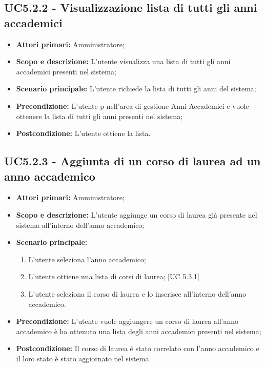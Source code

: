 \documentclass[AnalisiDeiRequisiti.tex]{subfiles}
\begin{document}
\subsection{UC5.2.2 - Visualizzazione lista di tutti gli anni accademici}
\begin{itemize}
	\item \textbf{Attori primari:} Amministratore;
	\item \textbf{Scopo e descrizione:} L'utente visualizza una lista di tutti gli anni accademici presenti nel sistema;
	\item \textbf{Scenario principale:} L'utente richiede la lista di tutti gli anni del sistema;
	\item \textbf{Precondizione:} L'utente p nell'area di gestione Anni Accademici e vuole ottenere la lista di tutti gli anni presenti nel sistema; 
	\item \textbf{Postcondizione:} L'utente ottiene la lista.
\end{itemize}
\subsection{UC5.2.3 - Aggiunta di un corso di laurea ad un anno accademico}
\begin{itemize}
	\item \textbf{Attori primari:} Amministratore;
	\item \textbf{Scopo e descrizione:} L'utente aggiunge un corso di laurea già presente nel sistema all'interno dell'anno accademico;
	\item \textbf{Scenario principale:}
	\begin{enumerate}
		\item L'utente seleziona l'anno accademico;
		\item L'utente ottiene una lista di corsi di laurea; [UC 5.3.1]
		\item L'utente seleziona il corso di laurea e lo inserisce all'interno dell'anno accademico.
	\end{enumerate}
	\item \textbf{Precondizione:} L'utente vuole aggiungere un corso di laurea all'anno accademico è ha ottenuto una lista degli anni accademici presenti nel sistema; 
	\item \textbf{Postcondizione:} Il corso di laurea è stato correlato con l'anno accademico e il loro stato è stato aggiornato nel sistema.
\end{itemize}
\end{document}
